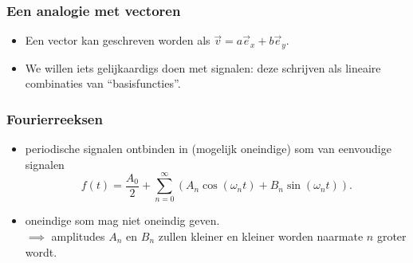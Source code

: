 \documentclass[compress, darktitle, framenumber, totalframenumber]{beamer}
\newcommand{\brac}[1]{\left( #1 \right)} %
\begin{document}
\begin{frame}[fragile]
\frametitle{Een analogie met vectoren}
\begin{itemize}
\item Een vector kan geschreven worden als $\vec{v}=a\vec{e}_x+b\vec{e}_y.$
\end{itemize}
\begin{center}
\end{center}
\begin{itemize}
\item We willen iets gelijkaardigs doen met signalen: deze schrijven als lineaire combinaties van ``basisfuncties''.
\end{itemize}
\end{frame}

\begin{frame}
\frametitle{Fourierreeksen}
\begin{itemize}
\item periodische signalen ontbinden in (mogelijk oneindige) som van eenvoudige signalen 
\begin{equation*}
f(t)=\frac{A_0}{2}+\sum_{n=0}^{\infty}\brac{A_n \cos(\omega_n t)+B_n\sin(\omega_n t)}. 
\end{equation*}
\item oneindige som mag niet oneindig geven. \\ \noindent 
$\implies$ amplitudes $A_n$ en $B_n$ zullen kleiner en kleiner worden naarmate $n$ groter wordt. 
\end{itemize}
\end{frame}
\end{document}
